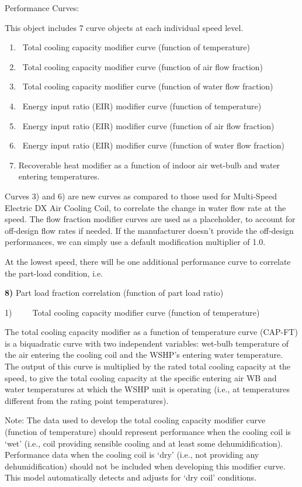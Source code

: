 Performance Curves:

This object includes 7 curve objects at each individual speed level.

\begin{enumerate}
\def\labelenumi{\arabic{enumi})}
\item
  ~Total cooling capacity modifier curve (function of temperature)
\item
  ~Total cooling capacity modifier curve (function of air flow fraction)
\item
  ~Total cooling capacity modifier curve (function of water flow fraction)
\item
  ~Energy input ratio (EIR) modifier curve (function of temperature)
\item
  ~Energy input ratio (EIR) modifier curve (function of air flow fraction)
\item
  ~Energy input ratio (EIR) modifier curve (function of water flow fraction)
\item
  Recoverable heat modifier as a function of indoor air wet-bulb and water entering temperatures.
\end{enumerate}

Curves 3) and 6) are new curves as compared to those used for Multi-Speed Electric DX Air Cooling Coil, to correlate the change in water flow rate at the speed. The flow fraction modifier curves are used as a placeholder, to account for off-design flow rates if needed. If the manufacturer doesn't provide the off-design performances, we can simply use a default modification multiplier of 1.0.

At the lowest speed, there will be one additional performance curve to correlate the part-load condition, i.e.

\textbf{8)} Part load fraction correlation (function of part load ratio)

1)~~~~~Total cooling capacity modifier curve (function of temperature)

The total cooling capacity modifier as a function of temperature curve (CAP-FT) is a biquadratic curve with two independent variables: wet-bulb temperature of the air entering the cooling coil and the WSHP's entering water temperature. The output of this curve is multiplied by the rated total cooling capacity at the speed, to give the total cooling capacity at the specific entering air WB and water temperatures at which the WSHP unit is operating (i.e., at temperatures different from the rating point temperatures).

Note: The data used to develop the total cooling capacity modifier curve (function of temperature) should represent performance when the cooling coil is `wet' (i.e., coil providing sensible cooling and at least some dehumidification). Performance data when the cooling coil is `dry' (i.e., not providing any dehumidification) should not be included when developing this modifier curve. This model automatically detects and adjusts for `dry coil' conditions.

